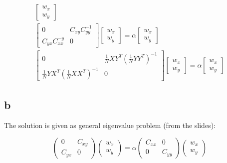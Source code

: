 \begin{gather*}
\begin{bmatrix}
w_x \\
w_y
\end{bmatrix} \\
 \begin{bmatrix}
0 & C_{xy} C_{yy}^{-1} \\
C_{yx} C_{xx}^{-y} & 0
\end{bmatrix}
 \begin{bmatrix}
w_x \\
w_y
\end{bmatrix}
= \alpha
 \begin{bmatrix}
w_x \\
w_y
\end{bmatrix} \\
 \begin{bmatrix}
0 & \frac{1}{N} XY^{T} (\frac{1}{N} YY^{T})^{-1} \\
\frac{1}{N} YX^{T} (\frac{1}{N} XX^{T})^{-1} & 0
\end{bmatrix}
 \begin{bmatrix}
w_x \\
w_y
\end{bmatrix}
= \alpha
 \begin{bmatrix}
w_x \\
w_y
\end{bmatrix}
\end{gather*}


\subsection*{b}

The solution is given as general eigenvalue problem (from the slides):

\begin{equation}
    \begin{pmatrix}
        0 & C_{xy} \\
        C_{yx} & 0
    \end{pmatrix}
    \begin{pmatrix}
        w_x \\ w_y
    \end{pmatrix}
    = \alpha \begin{pmatrix}
        C_{xx} & 0 \\
        0 & C_{yy}
    \end{pmatrix}
    \begin{pmatrix}
        w_x \\ w_y
    \end{pmatrix}
\end{equation}

